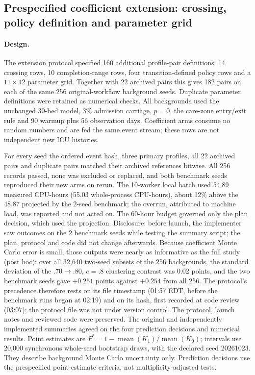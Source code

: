 \documentclass[11pt]{article}
\begin{document}
\subsection{Prespecified coefficient extension: crossing, policy definition and parameter grid}\label{sec:s-coef-extension}

\paragraph{Design.} The extension protocol specified 160 additional
profile-pair definitions: 14 crossing rows, 10 completion-range rows, four
transition-defined policy rows and a $11\times12$ parameter grid. Together with
22 archived pairs this gives 182 pairs on each of the same 256 original-workflow
background seeds. Duplicate parameter definitions were retained as numerical
checks. All backgrounds used the unchanged 30-bed model, 3\% admission carriage,
$p=0$, the care-zone entry/exit rule and 90 warmup plus 56 observation days.
Coefficient arms consume no random numbers and are fed the same event stream;
these rows are not independent new ICU histories.

For every seed the ordered event hash, three primary profiles, all 22 archived
pairs and duplicate pairs matched their archived references bitwise. All 256
records passed, none was excluded or replaced, and both benchmark seeds
reproduced their new arms on rerun. The 10-worker local batch used 54.89 measured
CPU-hours (55.03 whole-process CPU-hours), about 12\% above the 48.87 projected
by the 2-seed benchmark; the overrun, attributed to machine load, was reported
and not acted on. The 60-hour budget governed only the plan decision, which
used the projection. Disclosure: before launch, the implementer saw outcomes
on the 2 benchmark seeds while testing the summary script; the plan, protocol
and code did not change afterwards. Because coefficient Monte Carlo error is
small, those outputs were nearly as informative as the full study (post hoc):
over all 32,640 two-seed subsets of the 256 backgrounds, the standard deviation
of the .70$\to$.80, $e=.8$ clustering contrast was 0.02 points, and the two
benchmark seeds gave $+0.251$ points against $+0.254$ from all 256. The
protocol's precedence therefore rests on its file timestamp (01:57 EDT, before
the benchmark runs began at 02:19) and on its hash, first recorded at code
review (03:07); the protocol file was not under version control. The protocol, launch notes and reviewed code were preserved. The
original and independently implemented summaries agreed on the four prediction
decisions and numerical results. Point estimates are
$F^*=1-\operatorname{mean}(K_1)/\operatorname{mean}(K_0)$; intervals use 20,000
synchronous whole-seed bootstrap draws, with the declared seed 20261023.
They describe background Monte Carlo uncertainty only. Prediction decisions use
the prespecified point-estimate criteria, not multiplicity-adjusted tests.
\end{document}
